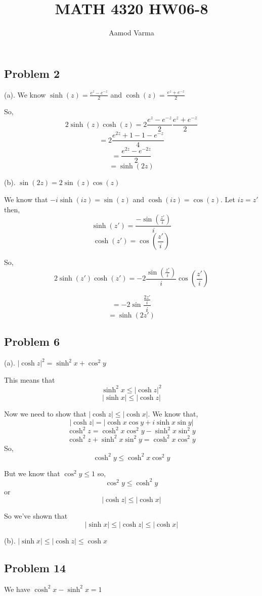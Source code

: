 \documentclass[a4paper]{report}
\title{MATH 4320 HW06-8}
\author{Aamod Varma}
\begin{document}
\maketitle


\subsection*{Problem 2}

(a). We know $\sinh(z) =  \frac{e^{z}-e^{-z}}{2}$ and $\cosh(z) =\frac{e^{z}+e^{-z}}{2} $

So, $$2\sinh(z)\cosh(z) = 2 \frac{e^{z}-e^{-z}}{2}\frac{e^{z}+e^{-z}}{2} $$
$$ =  2\frac{e^{2z} + 1 - 1 - e^{-z}}{4}$$ 
$$ = \frac{e^{2z} - e^{-2z}}{2}$$ 
$$ = \sinh(2z) $$ 



(b). $\sin(2z) = 2\sin(z)\cos(z)$

We know that  $-i\sinh(iz) = \sin(z)$ and  $\cosh(iz) = \cos(z)$. Let $iz = z'$ then,  
$$ \sinh(z') = \frac{-\sin(\frac{z'}{i})}{i} $$  
$$ \cosh(z') = \cos(\frac{z'}{i}) $$  

So, $$2\sinh(z')\cosh(z') = -2\frac{\sin(\frac{z'}{i})}{i}\cos(\frac{z'}{i}) $$

$$= -2\sin\frac{\frac{2z'}{i}}{i}$$
$$= \sinh(2z')$$

\subsection*{Problem 6}
(a). $|\cosh z|^2 = \sinh^2 x + \cos^2 y$

This means that  
$$ \sinh^2 x \le |\cosh z|^2 $$ 
$$ |\sinh x| \le |\cosh z| $$ 


Now we need to show that $|\cosh z| \le |\cosh x|$. We know that, 
$$ |\cosh z| = |\cosh x \cos y + i \sinh x \sin y| $$ 
$$ \cosh^2 z = \cosh^2 x \cos^2 y -  \sinh^2 x \sin^2 y $$ 
$$ \cosh^2 z  + \sinh^2 x \sin^2 y  = \cosh^2 x \cos^2 y $$ 
So, 
$$ \cosh^2 y \le \cosh^2x \cos^2 y $$ 

But we know that $\cos^2y \le 1$ so, 
$$ \cos^2 y \le \cosh^2 y $$  or 
$$ |\cosh z | \le |\cosh x| $$ 


So we've shown that 
$$ |\sinh x| \le |\cosh z| \le |\cosh x| $$ 


(b). $|\sinh x| \le |\cosh z| \le \cosh x$


\subsection*{Problem 14}
We have $\cosh^2 x - \sinh^2 x = 1 $
\end{document}
